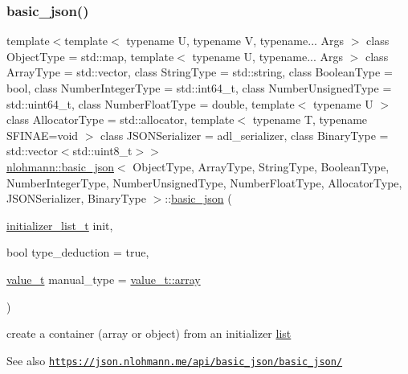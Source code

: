 \subsubsection{\texorpdfstring{basic\+\_\+json()}{basic\_json()}\hspace{0.1cm}{\footnotesize\ttfamily [5/9]}}
{\footnotesize\ttfamily template$<$template$<$ typename U, typename V, typename... Args $>$ class Object\+Type = std\+::map, template$<$ typename U, typename... Args $>$ class Array\+Type = std\+::vector, class String\+Type  = std\+::string, class Boolean\+Type  = bool, class Number\+Integer\+Type  = std\+::int64\+\_\+t, class Number\+Unsigned\+Type  = std\+::uint64\+\_\+t, class Number\+Float\+Type  = double, template$<$ typename U $>$ class Allocator\+Type = std\+::allocator, template$<$ typename T, typename S\+F\+I\+N\+A\+E=void $>$ class J\+S\+O\+N\+Serializer = adl\+\_\+serializer, class Binary\+Type  = std\+::vector$<$std\+::uint8\+\_\+t$>$$>$ \\
\hyperlink{classnlohmann_1_1basic__json}{nlohmann\+::basic\+\_\+json}$<$ Object\+Type, Array\+Type, String\+Type, Boolean\+Type, Number\+Integer\+Type, Number\+Unsigned\+Type, Number\+Float\+Type, Allocator\+Type, J\+S\+O\+N\+Serializer, Binary\+Type $>$\+::\hyperlink{classnlohmann_1_1basic__json}{basic\+\_\+json} (\begin{DoxyParamCaption}\item[{\hyperlink{classnlohmann_1_1basic__json_ac569f292a070dfd2f6b69c16e746095a}{initializer\+\_\+list\+\_\+t}}]{init,  }\item[{bool}]{type\+\_\+deduction = {\ttfamily true},  }\item[{\hyperlink{namespacenlohmann_1_1detail_a1ed8fc6239da25abcaf681d30ace4985}{value\+\_\+t}}]{manual\+\_\+type = {\ttfamily \hyperlink{namespacenlohmann_1_1detail_a1ed8fc6239da25abcaf681d30ace4985af1f713c9e000f5d3f280adbd124df4f5}{value\+\_\+t\+::array}} }\end{DoxyParamCaption})\hspace{0.3cm}{\ttfamily [inline]}}



create a container (array or object) from an initializer \hyperlink{protocollist-p}{list} 

\begin{DoxySeeAlso}{See also}
\href{https://json.nlohmann.me/api/basic_json/basic_json/}{\tt https\+://json.\+nlohmann.\+me/api/basic\+\_\+json/basic\+\_\+json/} 
\end{DoxySeeAlso}
\mbox{\label{classnlohmann_1_1basic__json_afbccea367512a87b5d76e2bd92c5cc85}} 
